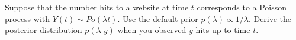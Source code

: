 \item Suppose that the number hits to a website at time $t$ corresponds to a Poisson process with $Y(t)\sim Po(\lambda t)$. Use the default prior  $p(\lambda) \propto 1/ \lambda$. Derive the posterior distribution $p(\lambda | y)$ when you observed $y$ hits up to time $t$. 


